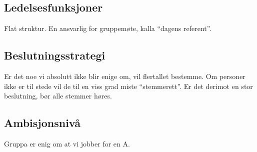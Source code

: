 \subsection{Ledelsesfunksjoner}
Flat struktur. En ansvarlig for gruppemøte, kalla “dagens referent”.
\subsection{Beslutningsstrategi}
Er det noe vi absolutt ikke blir enige om, vil flertallet bestemme. Om personer ikke er til stede vil de til en viss grad miste “stemmerett”. Er det derimot en stor beslutning, bør alle stemmer høres.
\subsection{Ambisjonsnivå}
Gruppa er enig om at vi jobber for en A.